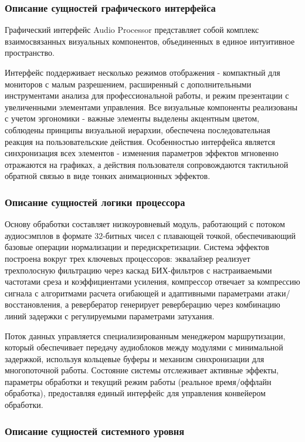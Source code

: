 \subsubsection{Описание сущностей графического интерфейса}

Графический интерфейс Audio Processor представляет собой комплекс взаимосвязанных визуальных компонентов, объединенных в единое интуитивное пространство. 

Интерфейс поддерживает несколько режимов отображения - компактный для мониторов с малым разрешением, расширенный с дополнительными инструментами анализа для профессиональной работы, и режим презентации с увеличенными элементами управления. Все визуальные компоненты реализованы с учетом эргономики - важные элементы выделены акцентным цветом, соблюдены принципы визуальной иерархии, обеспечена последовательная реакция на пользовательские действия. Особенностью интерфейса является синхронизация всех элементов - изменения параметров эффектов мгновенно отражаются на графиках, а действия пользователя сопровождаются тактильной обратной связью в виде тонких анимационных эффектов.

\subsubsection{Описание сущностей логики процессора}

Основу обработки составляет низкоуровневый модуль, работающий с потоком аудиосэмплов в формате 32-битных чисел с плавающей точкой, обеспечивающий базовые операции нормализации и передискретизации. Система эффектов построена вокруг трех ключевых процессоров: эквалайзер реализует трехполосную фильтрацию через каскад БИХ-фильтров с настраиваемыми частотами среза и коэффициентами усиления, компрессор отвечает за компрессию сигнала с алгоритмами расчета огибающей и адаптивными параметрами атаки/восстановления, а ревербератор генерирует реверберацию через комбинацию линий задержки с регулируемыми параметрами затухания.

Поток данных управляется специализированным менеджером маршрутизации, который обеспечивает передачу аудиоблоков между модулями с минимальной задержкой, используя кольцевые буферы и механизм синхронизации для многопоточной работы. Состояние системы отслеживает активные эффекты, параметры обработки и текущий режим работы (реальное время/оффлайн обработка), предоставляя единый интерфейс для управления конвейером обработки. 

\subsubsection{Описание сущностей системного уровня}

